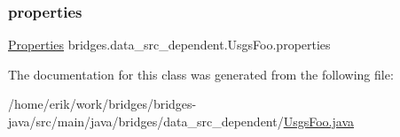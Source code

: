 \mbox{\label{classbridges_1_1data__src__dependent_1_1_usgs_foo_a030d83e136f146824b5bda34a4c6fd1c}} 
\subsubsection{\texorpdfstring{properties}{properties}}
{\footnotesize\ttfamily \hyperlink{classbridges_1_1data__src__dependent_1_1_usgs_foo_1_1_properties}{Properties} bridges.\+data\+\_\+src\+\_\+dependent.\+Usgs\+Foo.\+properties}



The documentation for this class was generated from the following file\+:\begin{DoxyCompactItemize}
\item 
/home/erik/work/bridges/bridges-\/java/src/main/java/bridges/data\+\_\+src\+\_\+dependent/\hyperlink{_usgs_foo_8java}{Usgs\+Foo.\+java}\end{DoxyCompactItemize}
